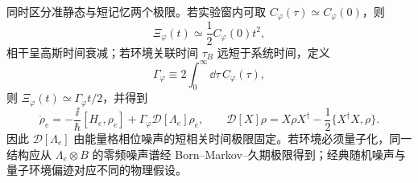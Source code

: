  同时区分准静态与短记忆两个极限。若实验窗内可取 $C_\varphi(\tau)\simeq C_\varphi(0)$，则
\[
\Xi_\varphi(t)\simeq\frac12C_\varphi(0)t^2,
\]
相干呈高斯时间衰减；若环境关联时间 $\tau_B$ 远短于系统时间，定义
\[
\Gamma_\varphi\equiv2\int_0^\infty\dd\tau\,C_\varphi(\tau),
\]
则 $\Xi_\varphi(t)\simeq\Gamma_\varphi t/2$，并得到
\begin{equation}
\boxed{
\dot\rho_e
=-\frac{\ii}{\hbar}[H_e,\rho_e]
+\Gamma_\varphi\mathcal D[\Lambda_e]\rho_e,
\qquad
\mathcal D[X]\rho=X\rho X^\dagger-\frac12\{X^\dagger X,\rho\}.}
\label{eq:energy_lattice_pure_dephasing_gksl}
\end{equation}
因此 $\mathcal D[\Lambda_e]$ 由能量格相位噪声的短相关时间极限固定。若环境必须量子化，同一结构应从 $\Lambda_e\otimes B$ 的零频噪声谱经 Born--Markov--久期极限得到；经典随机噪声与量子环境偏迹对应不同的物理假设。

